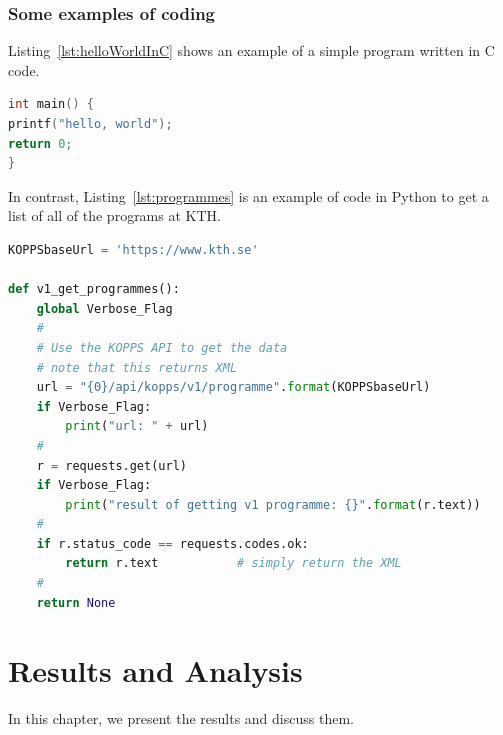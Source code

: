 \documentclass[english, bibtex]{kththesis}
\begin{document}
\subsection{Some examples of coding}

Listing~\ref{lst:helloWorldInC} shows an example of a simple program written
in C code.

\begin{lstlisting}[language={C}, caption={Hello world in C code}, label=lst:helloWorldInC]
int main() {
printf("hello, world");
return 0;
}
\end{lstlisting}


In contrast, Listing~\ref{lst:programmes} is an example of code in Python to
get a list of all of the programs at KTH.

\lstset{extendedchars=true}
\begin{lstlisting}[language={Python}, caption={Using a python program to
    access the KTH API to get all of the programs at KTH}, label=lst:programmes]
KOPPSbaseUrl = 'https://www.kth.se'

def v1_get_programmes():
    global Verbose_Flag
    #
    # Use the KOPPS API to get the data
    # note that this returns XML
    url = "{0}/api/kopps/v1/programme".format(KOPPSbaseUrl)
    if Verbose_Flag:
        print("url: " + url)
    #
    r = requests.get(url)
    if Verbose_Flag:
        print("result of getting v1 programme: {}".format(r.text))
    #
    if r.status_code == requests.codes.ok:
        return r.text           # simply return the XML
    #
    return None
\end{lstlisting}


\cleardoublepage
\chapter{Results and Analysis}
\label{ch:resultsAndAnalysis}


In this chapter, we present the results and discuss them.

\end{document}
